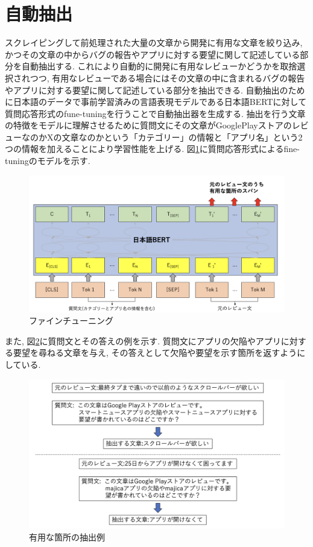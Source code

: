 
\section{自動抽出}
スクレイピングして前処理された大量の文章から開発に有用な文章を絞り込み, かつその文章の中からバグの報告やアプリに対する要望に関して記述している部分を自動抽出する. これにより自動的に開発に有用なレビューかどうかを取捨選択されつつ, 有用なレビューである場合にはその文章の中に含まれるバグの報告やアプリに対する要望に関して記述している部分を抽出できる. 自動抽出のために日本語のデータで事前学習済みの言語表現モデルである日本語BERTに対して質問応答形式のfune-tuningを行うことで自動抽出器を生成する. 
抽出を行う文章の特徴をモデルに理解させるために質問文にその文章がGooglePlayストアのレビューなのかXの文章なのかという「カテゴリー」の情報と「アプリ名」という2つの情報を加えることにより学習性能を上げる. 図\ref{fig:fine-tuning}に質問応答形式によるfine-tuningのモデルを示す. 

\begin{figure}[hbtp]
  \centering
  \includegraphics[scale=0.3]
       {contents/images/fine-tuning.png}
  \caption{ファインチューニング\label{fig:fine-tuning}}
 \end{figure}

また, 図\ref{fig:answer}に質問文とその答えの例を示す. 質問文にアプリの欠陥やアプリに対する要望を尋ねる文章を与え, その答えとして欠陥や要望を示す箇所を返すようにしている. 
\begin{figure}[hbtp]
  \centering
  \includegraphics[scale=0.4]
       {contents/images/answer.png}
  \caption{有用な箇所の抽出例\label{fig:answer}}
\end{figure}

